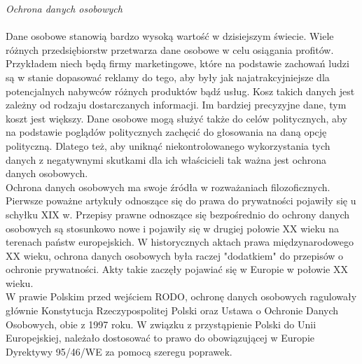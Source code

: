 \documentclass[en, noamssymb]{mgr}
\begin{document}
\indent \textit{Ochrona danych osobowych} \\ \\
\indent Dane osobowe stanowią bardzo wysoką wartość w dzisiejszym świecie.
Wiele różnych przedsiębiorstw przetwarza dane osobowe w celu osiągania profitów. Przykładem niech będą firmy marketingowe, które na podstawie zachowań ludzi są w stanie dopasować reklamy do tego, aby były jak najatrakcyjniejsze dla potencjalnych nabywców różnych produktów bądź usług. Kosz takich danych jest zależny od rodzaju dostarczanych informacji. Im bardziej precyzyjne dane, tym koszt jest większy. Dane osobowe mogą służyć także do celów politycznych, aby na podstawie poglądów politycznych zachęcić do głosowania na daną opcję polityczną. Dlatego też, aby uniknąć niekontrolowanego wykorzystania tych danych z negatywnymi skutkami dla ich właścicieli tak ważna jest ochrona danych osobowych.\\
\indent Ochrona danych osobowych ma swoje źródła w rozważaniach filozoficznych. Pierwsze poważne artykuły odnoszące się do prawa do prywatności pojawiły się u schyłku XIX w. Przepisy prawne odnoszące się bezpośrednio do ochrony danych osobowych są stosunkowo nowe i pojawiły się w drugiej połowie XX wieku na terenach państw europejskich. W historycznych aktach prawa międzynarodowego XX wieku, ochrona danych osobowych była raczej "dodatkiem" do przepisów o ochronie prywatności. Akty takie zaczęły pojawiać się w Europie w połowie XX wieku.\\
\indent W prawie Polskim przed wejściem RODO, ochronę danych osobowych ragulowały głównie Konstytucja Rzeczypospolitej Polski oraz Ustawa o Ochronie Danych Osobowych, obie z 1997 roku. W związku z przystąpienie Polski do Unii Europejskiej, należało dostosować to prawo do obowiązującej w Europie Dyrektywy 95/46/WE za pomocą szeregu poprawek.\\ \\
\end{document}
